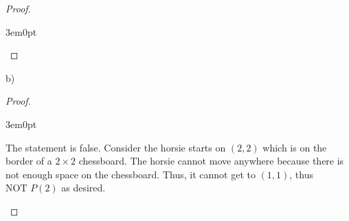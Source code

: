 \documentclass[11pt]{article}
\newcommand{\Not}{\mbox{NOT }}
\newenvironment{myproof}
{\begin{proof} \begin{adjustwidth}{3em}{0pt}$ $\par\nobreak\ignorespaces}
{\end{adjustwidth} \end{proof}}
\begin{document}
\begin{flushleft}
\begin{myproof}
\end{myproof}

b)
\begin{myproof}
The statement is false. Consider the horsie starts on $(2,2)$ which is on the border of a $2 \times 2$ chessboard. The horsie cannot move anywhere because there is not enough space on the chessboard. Thus, it cannot get to $(1,1)$, thus $\Not P(2)$ as desired.
\end{myproof}

\end{flushleft}
\end{document}
